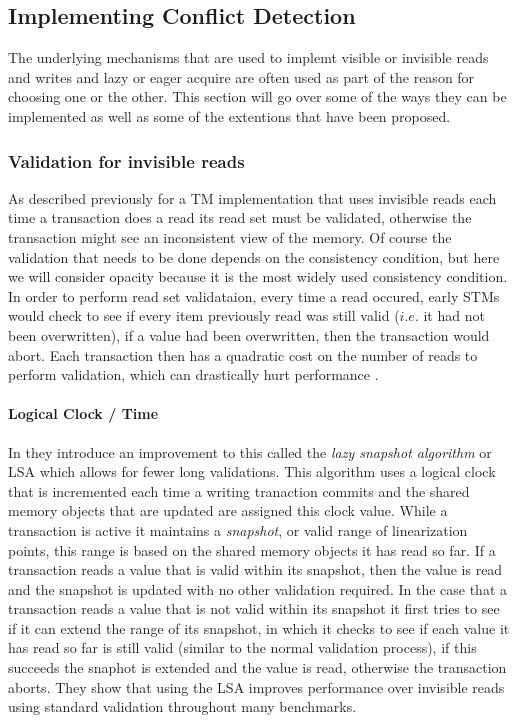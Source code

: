 \subsection{Implementing Conflict Detection}
The underlying mechanisms that are used to implemt visible or invisible reads and writes and lazy or eager acquire are often used as part of the reason for choosing one or the other.  This section will go over some of the ways they can be implemented as well as some of the extentions that have been proposed.

\subsubsection{Validation for invisible reads}
As described previously for a TM implementation that uses invisible reads each time a transaction does a read its read set must be validated, otherwise the transaction might see an inconsistent view of the memory.
Of course the validation that needs to be done depends on the consistency condition, but here we will consider opacity because it is the most widely used  consistency condition.
In order to perform read set validataion, every time a read occured, early STMs would check to see if every item previously read was still valid ($i.e.$ it had not been overwritten), if a value had been overwritten, then the transaction would abort.
Each transaction then has a quadratic cost on the number of reads to perform validation, which can drastically hurt performance \cite{10.1109/TPDS.2010.49}.

\paragraph{Logical Clock / Time}
In \cite{10.1109/TPDS.2010.49} they introduce an improvement to this called the \emph{lazy snapshot algorithm} or LSA which allows for fewer long validations.
This algorithm uses a logical clock that is incremented each time a writing tranaction commits and the shared memory objects that are updated are assigned this clock value.
While a transaction is active it maintains a \emph{snapshot}, or valid range of linearization points, this range is based on the shared memory objects it has read so far.
If a transaction reads a value that is valid within its snapshot, then the value is read and the snapshot is updated with no other validation required.
In the case that a transaction reads a value that is not valid within its snapshot it first tries to see if it can extend the range of its snapshot, in which it checks to see if each value it has read so far is still valid (similar to the normal validation process), if this succeeds the snaphot is extended and the value is read, otherwise the transaction aborts.
They show that using the LSA improves performance over invisible reads using standard validation throughout many benchmarks.

